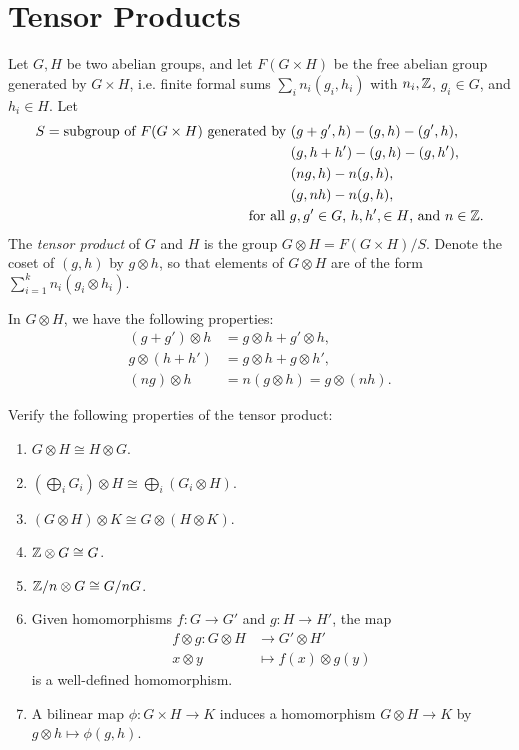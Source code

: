 \section{Tensor Products}
\begin{definition}
  Let $G, H$ be two abelian groups, and let
  $F(G \times H)$ be the free abelian group
  generated by $G \times H$, i.e.
  finite formal sums $\sum_i n_i (g_i, h_i)$
  with $n_i, \mathbb{Z}$, $g_i \in G$, and $h_i \in H$.
  Let
  \begin{align*}
  S = \text{subgroup of $F(G \times H)$ generated by }
  &(g + g', h) - (g, h) - (g', h), \\
  &(g, h + h') - (g, h) - (g, h'), \\
  &(ng, h) - n(g, h), \\
  &(g, nh) - n(g, h), \\
  &\hspace{-3em} \text{for all $g, g' \in G$, $h, h', \in H$, and $n \in \Z$}.
  \end{align*}
  The \emph{tensor product} of $G$ and $H$ is
  the group $G \otimes H = F(G \times H) / S$.
  Denote the coset of $(g, h)$ by $g \otimes h$,
  so that elements of $G \otimes H$
  are of the form $\sum_{i = 1}^k n_i (g_i \otimes h_i)$.
\end{definition}

\begin{remark}
  In $G \otimes H$, we have the following
  properties:
  \begin{align*}
    (g + g') \otimes h &= g \otimes h + g' \otimes h, \\
    g \otimes (h + h') &= g \otimes h + g \otimes h', \\
    (ng) \otimes h &= n(g \otimes h) = g \otimes (nh).
  \end{align*}
\end{remark}

\begin{exercise}
  Verify the following properties of
  the tensor product:
  \begin{enumerate}
    \item $G \otimes H \cong H \otimes G$.
    \item $(\bigoplus_i G_i) \otimes H \cong \bigoplus_i (G_i \otimes H)$.
    \item $(G \otimes H) \otimes K \cong G \otimes (H \otimes K)$.
    \item $\mathbb{Z} \otimes G \cong G$.
    \item $\mathbb{Z} / n \otimes G \cong G / nG$.
    \item Given homomorphisms
      $f : G \to G'$ and $g : H \to H'$, the map
      \begin{align*}
        f \otimes g : G \otimes H
        &\longrightarrow G' \otimes H' \\
        x \otimes y
        &\longmapsto f(x) \otimes g(y)
      \end{align*}
      is a well-defined homomorphism.
    \item A bilinear map $\phi : G \times H \to K$
      induces a homomorphism
      $G \otimes H \to K$ by $g \otimes h \mapsto \phi(g, h)$.
  \end{enumerate}
\end{exercise}

